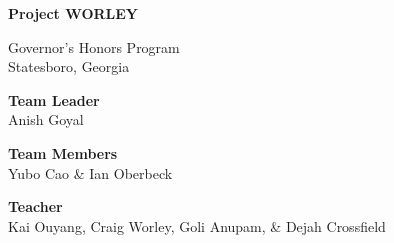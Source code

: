 \documentclass{article}
\renewcommand{\title}{Project WORLEY}
\begin{document}
\begin{titlepage}
  \centering
  \vspace*{1in}
  {\fontsize{56pt}{2\baselineskip}\selectfont \bfseries
  \title}
  \vfill

  \Large
  Governor's Honors Program\\
  Statesboro, Georgia

  \vspace{0.5in}
  \selectfont

  \vspace{1em}
  \textbf{Team Leader}\\ Anish Goyal

  \vspace{1em}
  \textbf{Team Members}\\ Yubo Cao \& Ian Oberbeck

  \vspace{1em}
  \textbf{Teacher}\\ Kai Ouyang, Craig Worley, Goli Anupam, \& Dejah Crossfield
\end{titlepage}
\tableofcontents
\newpage
\end{document}
